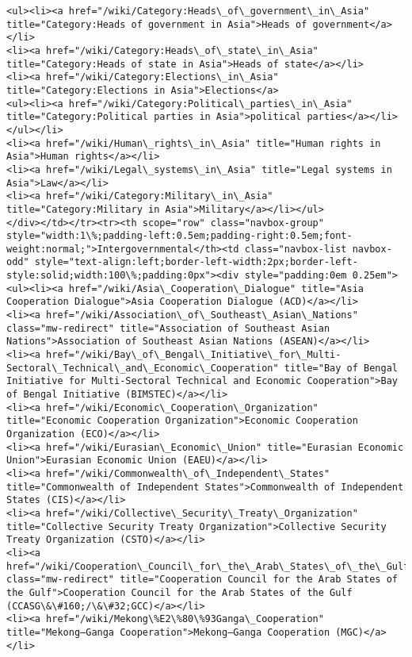 \documentclass[11pt]{article}
\begin{document}
\begin{Verbatim}[commandchars=\\\{\}]
<ul><li><a href="/wiki/Category:Heads\_of\_government\_in\_Asia" title="Category:Heads of government in Asia">Heads of government</a></li>
<li><a href="/wiki/Category:Heads\_of\_state\_in\_Asia" title="Category:Heads of state in Asia">Heads of state</a></li>
<li><a href="/wiki/Category:Elections\_in\_Asia" title="Category:Elections in Asia">Elections</a>
<ul><li><a href="/wiki/Category:Political\_parties\_in\_Asia" title="Category:Political parties in Asia">political parties</a></li></ul></li>
<li><a href="/wiki/Human\_rights\_in\_Asia" title="Human rights in Asia">Human rights</a></li>
<li><a href="/wiki/Legal\_systems\_in\_Asia" title="Legal systems in Asia">Law</a></li>
<li><a href="/wiki/Category:Military\_in\_Asia" title="Category:Military in Asia">Military</a></li></ul>
</div></td></tr><tr><th scope="row" class="navbox-group" style="width:1\%;padding-left:0.5em;padding-right:0.5em;font-weight:normal;">Intergovernmental</th><td class="navbox-list navbox-odd" style="text-align:left;border-left-width:2px;border-left-style:solid;width:100\%;padding:0px"><div style="padding:0em 0.25em">
<ul><li><a href="/wiki/Asia\_Cooperation\_Dialogue" title="Asia Cooperation Dialogue">Asia Cooperation Dialogue (ACD)</a></li>
<li><a href="/wiki/Association\_of\_Southeast\_Asian\_Nations" class="mw-redirect" title="Association of Southeast Asian Nations">Association of Southeast Asian Nations (ASEAN)</a></li>
<li><a href="/wiki/Bay\_of\_Bengal\_Initiative\_for\_Multi-Sectoral\_Technical\_and\_Economic\_Cooperation" title="Bay of Bengal Initiative for Multi-Sectoral Technical and Economic Cooperation">Bay of Bengal Initiative (BIMSTEC)</a></li>
<li><a href="/wiki/Economic\_Cooperation\_Organization" title="Economic Cooperation Organization">Economic Cooperation Organization (ECO)</a></li>
<li><a href="/wiki/Eurasian\_Economic\_Union" title="Eurasian Economic Union">Eurasian Economic Union (EAEU)</a></li>
<li><a href="/wiki/Commonwealth\_of\_Independent\_States" title="Commonwealth of Independent States">Commonwealth of Independent States (CIS)</a></li>
<li><a href="/wiki/Collective\_Security\_Treaty\_Organization" title="Collective Security Treaty Organization">Collective Security Treaty Organization (CSTO)</a></li>
<li><a href="/wiki/Cooperation\_Council\_for\_the\_Arab\_States\_of\_the\_Gulf" class="mw-redirect" title="Cooperation Council for the Arab States of the Gulf">Cooperation Council for the Arab States of the Gulf (CCASG\&\#160;/\&\#32;GCC)</a></li>
<li><a href="/wiki/Mekong\%E2\%80\%93Ganga\_Cooperation" title="Mekong–Ganga Cooperation">Mekong–Ganga Cooperation (MGC)</a></li>

\end{Verbatim}
\end{document}
